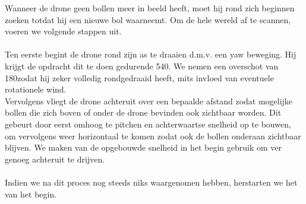 \noindent
Wanneer de drone geen bollen meer in beeld heeft, moet hij rond zich beginnen zoeken totdat hij een nieuwe bol waarneemt. Om de hele wereld af te scannen, voeren we volgende stappen uit.
\\
\\
Ten eerste begint de drone rond zijn as te draaien d.m.v. een yaw beweging. Hij krijgt de opdracht dit te doen gedurende 540\degree. We nemen een overschot van 180\degree  zodat hij zeker volledig rondgedraaid heeft, mits invloed van eventuele rotationele wind.
\\
Vervolgens vliegt de drone achteruit over een bepaalde afstand zodat mogelijke bollen die zich boven of onder de drone bevinden ook zichtbaar worden. Dit gebeurt door eerst omhoog te pitchen en achterwaartse snelheid op te bouwen, om vervolgens weer horizontaal te komen zodat ook de bollen onderaan zichtbaar blijven. We maken van de opgebouwde snelheid in het begin gebruik om ver genoeg achteruit te drijven.
\\
\\
Indien we na dit proces nog steeds niks waargenomen hebben, herstarten we het van het begin. 